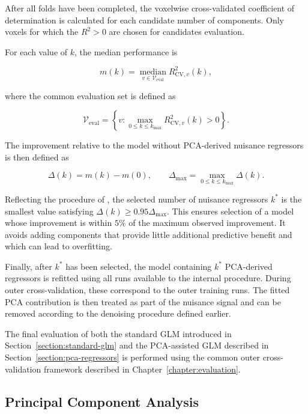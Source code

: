 \documentclass[english]{pwr_wmat_praca_dyplomowa}
\theoremstyle{definition}
\theoremstyle{remark}
\begin{document}
After all folds have been completed, the voxelwise cross-validated coefficient of determination is calculated for each candidate number of components. Only voxels for which the $R^2 > 0$ are chosen for candidates evaluation.

\newpage
For each value of $k$, the median performance is 

\begin{equation}
    m(k) = \operatorname*{median}_{v\in\mathcal{V}_{\mathrm{eval}}} R^2_{\mathrm{CV},v}(k),
\end{equation}

where the common evaluation set is defined as 

\begin{equation}
    \mathcal{V}_{\mathrm{eval}}
    = \left\{v : \max_{0\leq k\leq k_{\max}} R^2_{\mathrm{CV},v}(k) > 0\right\}.
\end{equation}

The improvement relative to the model without PCA-derived nuisance regressors is then defined as

\begin{equation}
    \Delta(k) = m(k)-m(0), \qquad \Delta_{\max} = \max_{0\leq k\leq k_{\max}} \Delta(k).
\end{equation}

Reflecting the procedure of \cite{glm-denoise}, the selected number of nuisance regressors $k^\ast$ is the smallest value satisfying $\Delta(k) \geq 0.95 \Delta_{\max}$. This ensures selection of a model whose improvement is within $5\%$ of the maximum observed improvement. It avoids adding components that provide little additional predictive benefit and which can lead to overfitting.

Finally, after $k^\ast$ has been selected, the model containing $k^\ast$ PCA-derived regressors is refitted using all runs available to the internal procedure. During outer cross-validation, these correspond to the outer training runs. The fitted PCA contribution is then treated as part of the nuisance signal and can be removed according to the denoising procedure defined earlier.

The final evaluation of both the standard GLM introduced in Section~\ref{section:standard-glm} and the PCA-assisted GLM described in Section~\ref{section:pca-regressors} is performed using the common outer cross-validation framework described in Chapter~\ref{chapter:evaluation}.


\subsection{Principal Component Analysis}
\label{section:pca}
\end{document}

